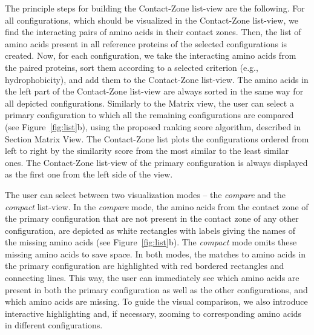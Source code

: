 \documentclass{bmcart}
\def\MatView {Matrix view\xspace}
\def\CoZoListView {Contact-Zone list-view\xspace}
\def\CoZoList{Contact-Zone list\xspace}
\begin{document}
The principle steps for building the \CoZoListView are the following.
For all configurations, which should be visualized in the \CoZoListView, we find the interacting pairs of amino acids in their contact zones.
Then, the list of amino acids present in all reference proteins of the selected configurations is created.
Now, for each configuration, we take the interacting amino acids from the paired proteins, sort them according to a selected criterion (e.g., hydrophobicity), and add them to the \CoZoListView.
The amino acids in the left part of the \CoZoListView are always sorted in the same way for all depicted configurations.
Similarly to the \MatView, the user can select a primary configuration to which all the remaining configurations are compared (see Figure~\ref{fig:list}b), using the proposed ranking score algorithm, described in Section Matrix View.
The \CoZoList plots the configurations ordered from left to right by the similarity score from the most similar to the least similar ones.
The \CoZoListView of the primary configuration is always displayed as the first one from the left side of the view.

The user can select between two visualization modes -- the \textit{compare} and the \textit{compact} list-view.
In the \textit{compare} mode, the amino acids from the contact zone of the primary configuration that are not present in the contact zone of any other configuration, are depicted as white rectangles with labels giving the names of the missing amino acids (see Figure~\ref{fig:list}b).
The \textit{compact} mode omits these missing amino acids to save space.
In both modes, the matches to amino acids in the primary configuration are highlighted with red bordered rectangles and connecting lines.
This way, the user can immediately see which amino acids are present in both the primary configuration as well as the other configurations, and which amino acids are missing.
To guide the visual comparison, we also introduce interactive highlighting and, if necessary, zooming to corresponding amino acids in different configurations.

\end{document}
